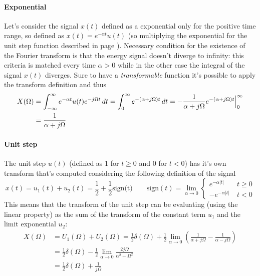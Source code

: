 	\paragraph{Exponential} Let's consider the signal $x(t)$ defined as a exponential only for the positive time range, so defined as $x(t) = e^{-\alpha t} u(t)$ (so multiplying the exponential for the unit step function described in page \pageref{eq:intro:unitstep}). Necessary condition for the existence of the Fourier transform is that the energy signal doesn't diverge to infinity: this criteria is matched every time $\alpha > 0$ while in the other case the integral of the signal $x(t)$ diverges. Sure to have a \textit{transformable} function it's possible to apply the transform definition and thus
	\begin{align*}
		X(\Omega) & = \int_{-\infty}^\infty e^{-\alpha t} u(t) e^{-j\Omega t}\, dt = \int_0 ^\infty e^{-(\alpha + j\Omega) t} \, dt = - \frac{1}{\alpha + j\Omega} e^{-(\alpha + j\Omega) t} \Big|_0^\infty \\
		& = \frac{1}{\alpha + j\Omega}
	\end{align*}
		
	\paragraph{Unit step} The unit step $u(t)$ (defined as 1 for $t\geq0$ and 0 for $t<0$) has it's own transform that's computed considering the following definition of the signal
	\[ x(t) = u_1(t) + u_2(t) = \frac 1 2 + \frac 1 2 \textrm{sign(t)} \qquad \textrm{sign}(t) = \lim_{\alpha\rightarrow 0}\begin{cases}
		e^{-\alpha|t|} \quad & t \geq 0 \\
		-e^{-\alpha |t|} & t < 0
	\end{cases}\]
	This means that the transform of the unit step can be evaluating (using the linear property) as the sum of the transform of the constant term $u_1$ and the limit exponential $u_2$:
	\begin{align*}
		X(\Omega) & = U_1(\Omega) + U_2(\Omega) = \frac 1 2 \delta(\Omega) + \frac 1 2 \lim_{\alpha\rightarrow 0} \left( \frac{1}{\alpha + j\Omega} - \frac{1}{\alpha - j\Omega} \right)  \\
		& = \frac 1 2 \delta(\Omega) - \frac 1 2 \lim_{\alpha\rightarrow 0}\frac{2j\Omega}{\alpha^2	 + \Omega^2} \\ 
		&= \frac 1 2 \delta(\Omega) + \frac{1}{j\Omega}
	\end{align*}
	
